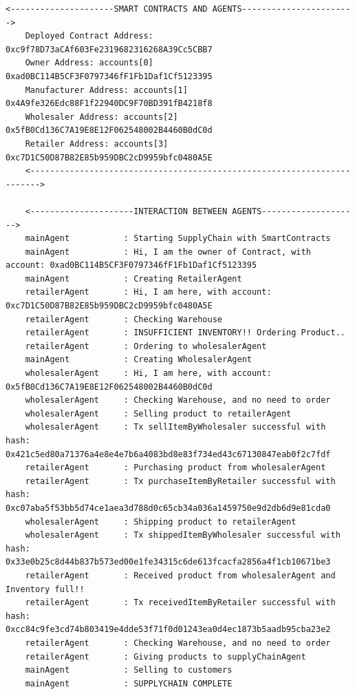 \begin{itemize}
    \vspace{.5cm}
    \begin{lstlisting}[numbers=none, basicstyle=\ttfamily\tiny]
    <---------------------SMART CONTRACTS AND AGENTS----------------------->
    Deployed Contract Address: 0xc9f78D73aCAf603Fe2319682316268A39Cc5CBB7
    Owner Address: accounts[0] 0xad0BC114B5CF3F0797346fF1Fb1Daf1Cf5123395
    Manufacturer Address: accounts[1] 0x4A9fe326Edc88F1f22940DC9F70BD391fB4218f8
    Wholesaler Address: accounts[2] 0x5fB0Cd136C7A19E8E12F062548002B4460B0dC0d
    Retailer Address: accounts[3] 0xc7D1C50D87B82E85b959DBC2cD9959bfc0480A5E
    <------------------------------------------------------------------------>
    
    <---------------------INTERACTION BETWEEN AGENTS-------------------->
    mainAgent           : Starting SupplyChain with SmartContracts
    mainAgent           : Hi, I am the owner of Contract, with account: 0xad0BC114B5CF3F0797346fF1Fb1Daf1Cf5123395
    mainAgent           : Creating RetailerAgent
    retailerAgent       : Hi, I am here, with account: 0xc7D1C50D87B82E85b959DBC2cD9959bfc0480A5E
    retailerAgent       : Checking Warehouse
    retailerAgent       : INSUFFICIENT INVENTORY!! Ordering Product..
    retailerAgent       : Ordering to wholesalerAgent
    mainAgent           : Creating WholesalerAgent
    wholesalerAgent     : Hi, I am here, with account: 0x5fB0Cd136C7A19E8E12F062548002B4460B0dC0d
    wholesalerAgent     : Checking Warehouse, and no need to order
    wholesalerAgent     : Selling product to retailerAgent
    wholesalerAgent     : Tx sellItemByWholesaler successful with hash: 0x421c5ed80a71376a4e8e4e7b6a4083bd8e83f734ed43c67130847eab0f2c7fdf
    retailerAgent       : Purchasing product from wholesalerAgent
    retailerAgent       : Tx purchaseItemByRetailer successful with hash: 0xc07aba5f53bb5d74ce1aea3d788d0c65cb34a036a1459750e9d2db6d9e81cda0
    wholesalerAgent     : Shipping product to retailerAgent
    wholesalerAgent     : Tx shippedItemByWholesaler successful with hash: 0x33e0b25c8d44b837b573ed00e1fe34315c6de613fcacfa2856a4f1cb10671be3
    retailerAgent       : Received product from wholesalerAgent and Inventory full!!
    retailerAgent       : Tx receivedItemByRetailer successful with hash: 0xcc84c9fe3cd74b803419e4dde53f71f0d01243ea0d4ec1873b5aadb95cba23e2
    retailerAgent       : Checking Warehouse, and no need to order
    retailerAgent       : Giving products to supplyChainAgent
    mainAgent           : Selling to customers
    mainAgent           : SUPPLYCHAIN COMPLETE
    \end{lstlisting}
    

\end{itemize}
